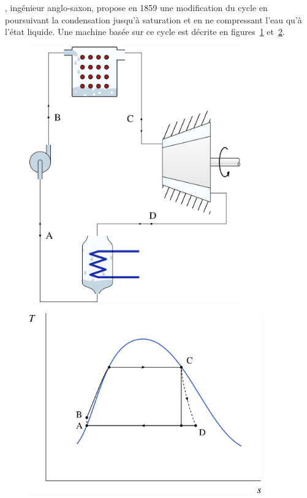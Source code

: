 		, ingénieur anglo-saxon, propose en 1859 une modification du cycle en poursuivant la condensation jusqu’à saturation et en ne compressant l’eau qu’à l’état liquide. Une machine basée sur ce cycle est décrite en figures~\ref{fig_cycle_rankine} et~\ref{fig_ts_lv_rankine}.

		\begin{figure}
			\begin{center}
				\includegraphics[height=11cm]{images/circuit_rankine.png}
			\end{center}
			\label{fig_cycle_rankine}
		\end{figure}

		\begin{figure}
			\begin{center}
				\includegraphics[width=10cm]{images/ts_lv_rankine.png}
			\end{center}
			\label{fig_ts_lv_rankine}
		\end{figure}

